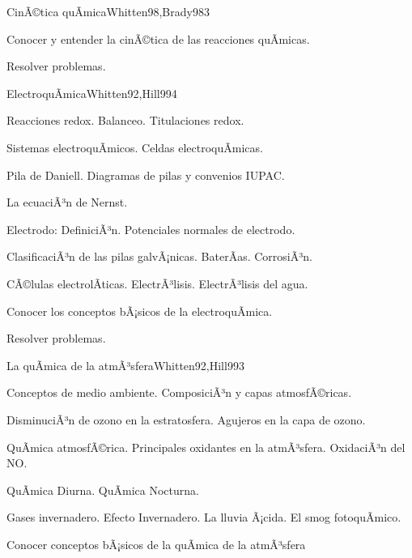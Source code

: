 \begin{syllabus}
\begin{unit}{CinÃ©tica quÃ­mica}{Whitten98,Brady98}{3}
   \begin{unitgoals}
      \item Conocer y entender la cinÃ©tica de las reacciones quÃ­micas.
      \item Resolver problemas.
   \end{unitgoals}
\end{unit}

\begin{unit}{ElectroquÃ­mica}{Whitten92,Hill99}{4}
\begin{topics}
      \item Reacciones redox. Balanceo. Titulaciones redox.
      \item Sistemas electroquÃ­micos. Celdas electroquÃ­micas.
      \item Pila de Daniell. Diagramas de pilas y convenios IUPAC.
      \item La ecuaciÃ³n de Nernst.
      \item Electrodo: DefiniciÃ³n. Potenciales normales de electrodo.
      \item ClasificaciÃ³n de las pilas galvÃ¡nicas. BaterÃ­as. CorrosiÃ³n.
      \item CÃ©lulas electrolÃ­ticas. ElectrÃ³lisis. ElectrÃ³lisis del agua.
   \end{topics}

   \begin{unitgoals}
      \item Conocer los conceptos bÃ¡sicos de la electroquÃ­mica.
      \item Resolver problemas.
   \end{unitgoals}
\end{unit}

\begin{unit}{La quÃ­mica de la atmÃ³sfera}{Whitten92,Hill99}{3}
\begin{topics}
      \item Conceptos de medio ambiente. ComposiciÃ³n y capas atmosfÃ©ricas.
      \item DisminuciÃ³n de ozono en la estratosfera. Agujeros en la capa de ozono.
      \item QuÃ­mica atmosfÃ©rica. Principales oxidantes en la atmÃ³sfera. OxidaciÃ³n del NO.
      \item QuÃ­mica Diurna. QuÃ­mica Nocturna.
      \item Gases invernadero. Efecto Invernadero. La lluvia Ã¡cida. El smog fotoquÃ­mico.
    \end{topics}

   \begin{unitgoals}
      \item Conocer conceptos bÃ¡sicos de la quÃ­mica de la atmÃ³sfera
   \end{unitgoals}
\end{unit}

\begin{coursebibliography}
\end{coursebibliography}
\end{syllabus}
